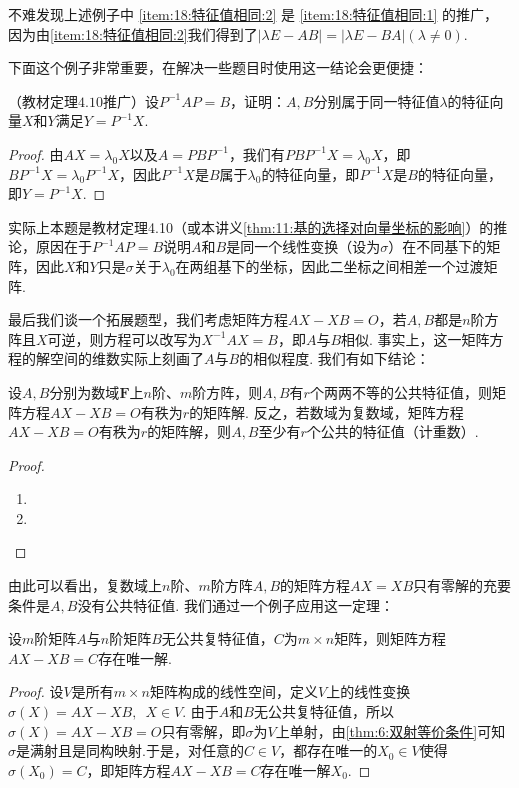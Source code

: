 不难发现上述例子中 \ref*{item:18:特征值相同:2} 是 \ref*{item:18:特征值相同:1} 的推广，因为由\ref*{item:18:特征值相同:2}我们得到了$|\lambda E-AB|=|\lambda E-BA|(\lambda\neq 0)$.

下面这个例子非常重要，在解决一些题目时使用这一结论会更便捷：
\begin{example}
    （教材定理$4.10$推广）设$P^{-1}AP=B$，证明：$A,B$分别属于同一特征值$\lambda$的特征向量$X$和$Y$满足$Y=P^{-1}X$.
\end{example}

\begin{proof}
    由$AX=\lambda_0 X$以及$A=PBP^{-1}$，我们有$PBP^{-1}X=\lambda_0 X$，即$BP^{-1}X=\lambda_0 P^{-1}X$，因此$P^{-1}X$是$B$属于$\lambda_0$的特征向量，即$P^{-1}X$是$B$的特征向量，即$Y=P^{-1}X$.
\end{proof}

实际上本题是教材定理4.10（或本讲义\autoref{thm:11:基的选择对向量坐标的影响}）的推论，原因在于$P^{-1}AP=B$说明$A$和$B$是同一个线性变换（设为$\sigma$）在不同基下的矩阵，因此$X$和$Y$只是$\sigma$关于$\lambda_0$在两组基下的坐标，因此二坐标之间相差一个过渡矩阵.

最后我们谈一个拓展题型，我们考虑矩阵方程$AX-XB=O$，若$A,B$都是$n$阶方阵且$X$可逆，则方程可以改写为$X^{-1}AX=B$，即$A$与$B$相似. 事实上，这一矩阵方程的解空间的维数实际上刻画了$A$与$B$的相似程度. 我们有如下结论：
\begin{theorem}
    设$A,B$分别为数域$\mathbf{F}$上$n$阶、$m$阶方阵，则$A,B$有$r$个两两不等的公共特征值，则矩阵方程$AX-XB=O$有秩为$r$的矩阵解. 反之，若数域为复数域，矩阵方程$AX-XB=O$有秩为$r$的矩阵解，则$A,B$至少有$r$个公共的特征值（计重数）.
\end{theorem}

\begin{proof}
    \begin{enumerate}
        \item

        \item
    \end{enumerate}
\end{proof}

由此可以看出，复数域上$n$阶、$m$阶方阵$A,B$的矩阵方程$AX=XB$只有零解的充要条件是$A,B$没有公共特征值. 我们通过一个例子应用这一定理：
\begin{example}
    设$m$阶矩阵$A$与$n$阶矩阵$B$无公共复特征值，$C$为$m\times n$矩阵，则矩阵方程$AX-XB=C$存在唯一解.
\end{example}

\begin{proof}
    设$V$是所有$m\times n$矩阵构成的线性空间，定义$V$上的线性变换$\sigma(X)=AX-XB,\enspace X\in V$. 由于$A$和$B$无公共复特征值，所以$\sigma(X)=AX-XB=O$只有零解，即$\sigma$为$V$上单射，由\autoref{thm:6:双射等价条件}可知$\sigma$是满射且是同构映射.于是，对任意的$C\in V$，都存在唯一的$X_0\in V$使得$\sigma(X_0)=C$，即矩阵方程$AX-XB=C$存在唯一解$X_0$.
\end{proof}

